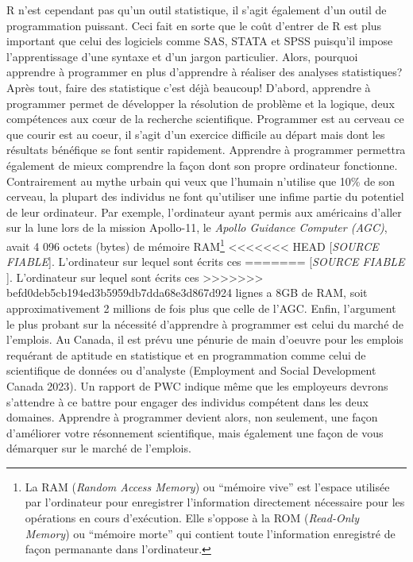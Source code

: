 \documentclass[
  letterpaper,
]{scrbook}
\begin{document}
R n'est cependant pas qu'un outil statistique, il s'agit également d'un
outil de programmation puissant. Ceci fait en sorte que le coût d'entrer
de R est plus important que celui des logiciels comme SAS, STATA et SPSS
puisqu'il impose l'apprentissage d'une syntaxe et d'un jargon
particulier. Alors, pourquoi apprendre à programmer en plus d'apprendre
à réaliser des analyses statistiques? Après tout, faire des statistique
c'est déjà beaucoup! D'abord, apprendre à programmer permet de
développer la résolution de problème et la logique, deux compétences aux
cœur de la recherche scientifique. Programmer est au cerveau ce que
courir est au coeur, il s'agit d'un exercice difficile au départ mais
dont les résultats bénéfique se font sentir rapidement. Apprendre à
programmer permettra également de mieux comprendre la façon dont son
propre ordinateur fonctionne. Contrairement au mythe urbain qui veux que
l'humain n'utilise que 10\% de son cerveau, la plupart des individus ne
font qu'utiliser une infime partie du potentiel de leur ordinateur. Par
exemple, l'ordinateur ayant permis aux américains d'aller sur la lune
lors de la mission Apollo-11, le \emph{Apollo Guidance Computer (AGC)},
avait 4 096 octets (bytes) de mémoire RAM\footnote{La RAM (\emph{Random
  Access Memory}) ou ``mémoire vive'' est l'espace utilisée par
  l'ordinateur pour enregistrer l'information directement nécessaire
  pour les opérations en cours d'exécution. Elle s'oppose à la ROM
  (\emph{Read-Only Memory}) ou ``mémoire morte'' qui contient toute
  l'information enregistré de façon permanante dans l'ordinateur.}
<<<<<<< HEAD
{[}\emph{SOURCE FIABLE}{]}. L'ordinateur sur lequel sont écrits ces
=======
{[}\emph{SOURCE FIABLE} {]}. L'ordinateur sur lequel sont écrits ces
>>>>>>> befd0deb5cb194ed3b5959db7dda68e3d867d924
lignes a 8GB de RAM, soit approximativement 2 millions de fois plus que
celle de l'AGC. Enfin, l'argument le plus probant sur la nécessité
d'apprendre à programmer est celui du marché de l'emplois. Au Canada, il
est prévu une pénurie de main d'oeuvre pour les emplois requérant de
aptitude en statistique et en programmation comme celui de scientifique
de données ou d'analyste (Employment and Social Development Canada
2023). Un rapport de PWC indique même que les employeurs devrons
s'attendre à ce battre pour engager des individus compétent dans les
deux domaines. Apprendre à programmer devient alors, non seulement, une
façon d'améliorer votre résonnement scientifique, mais également une
façon de vous démarquer sur le marché de l'emplois.
\end{document}

